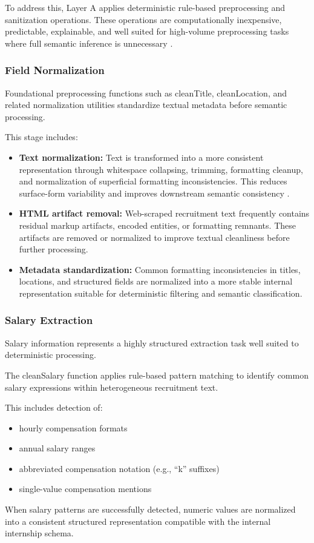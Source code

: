 To address this, Layer A applies deterministic rule-based preprocessing and sanitization operations. These operations are computationally inexpensive, predictable, explainable, and well suited for high-volume preprocessing tasks where full semantic inference is unnecessary \cite{doan2012principles, sarawagi2008information}.

\subsubsection*{Field Normalization}

Foundational preprocessing functions such as cleanTitle, cleanLocation, and related normalization utilities standardize textual metadata before semantic processing.

This stage includes:
\begin{itemize}[leftmargin=1.4em,itemsep=0.25em,topsep=0.25em]
\item \textbf{Text normalization:} Text is transformed into a more consistent representation through whitespace collapsing, trimming, formatting cleanup, and normalization of superficial formatting inconsistencies. This reduces surface-form variability and improves downstream semantic consistency \cite{doan2012principles}.
\item \textbf{HTML artifact removal:} Web-scraped recruitment text frequently contains residual markup artifacts, encoded entities, or formatting remnants. These artifacts are removed or normalized to improve textual cleanliness before further processing.
\item \textbf{Metadata standardization:} Common formatting inconsistencies in titles, locations, and structured fields are normalized into a more stable internal representation suitable for deterministic filtering and semantic classification.
\end{itemize}
\subsubsection*{Salary Extraction}

Salary information represents a highly structured extraction task well suited to deterministic processing.

The cleanSalary function applies rule-based pattern matching to identify common salary expressions within heterogeneous recruitment text.

This includes detection of:
\begin{itemize}[leftmargin=1.4em,itemsep=0.25em,topsep=0.25em]
\item hourly compensation formats
\item annual salary ranges
\item abbreviated compensation notation (e.g., ``k'' suffixes)
\item single-value compensation mentions
\end{itemize}
When salary patterns are successfully detected, numeric values are normalized into a consistent structured representation compatible with the internal internship schema.

